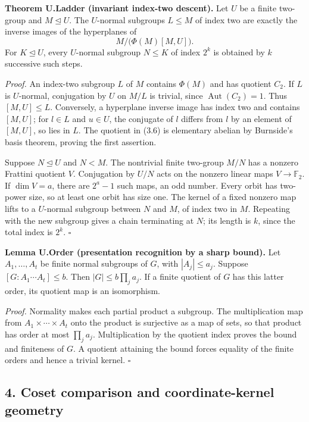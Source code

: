 \documentclass[
  11pt,
  a4paper,
]{article}
\begin{document}
\textbf{Theorem U.Ladder (invariant index-two descent).} Let \(U\) be a
finite two-group and \(M\unlhd U\). The \(U\)-normal subgroups
\(L\leq M\) of index two are exactly the inverse images of the
hyperplanes of \[
M/\bigl(\Phi(M)[M,U]\bigr).
\tag{3.6}
\] For \(K\unlhd U\), every \(U\)-normal subgroup \(N\leq K\) of index
\(2^k\) is obtained by \(k\) successive such steps.

\emph{Proof.} An index-two subgroup \(L\) of \(M\) contains \(\Phi(M)\)
and has quotient \(C_2\). If \(L\) is \(U\)-normal, conjugation by \(U\)
on \(M/L\) is trivial, since \(\operatorname{Aut}(C_2)=1\). Thus
\([M,U]\leq L\). Conversely, a hyperplane inverse image has index two
and contains \([M,U]\); for \(l\in L\) and \(u\in U\), the conjugate of
\(l\) differs from \(l\) by an element of \([M,U]\), so lies in \(L\).
The quotient in (3.6) is elementary abelian by Burnside's basis theorem,
proving the first assertion.

Suppose \(N\unlhd U\) and \(N<M\). The nontrivial finite two-group
\(M/N\) has a nonzero Frattini quotient \(V\). Conjugation by \(U/N\)
acts on the nonzero linear maps \(V\to\mathbb F_2\). If \(\dim V=a\),
there are \(2^a-1\) such maps, an odd number. Every orbit has two-power
size, so at least one orbit has size one. The kernel of a fixed nonzero
map lifts to a \(U\)-normal subgroup between \(N\) and \(M\), of index
two in \(M\). Repeating with the new subgroup gives a chain terminating
at \(N\); its length is \(k\), since the total index is \(2^k\).
\(\square\)

\textbf{Lemma U.Order (presentation recognition by a sharp bound).} Let
\(A_1,\ldots,A_t\) be finite normal subgroups of \(G\), with
\(|A_j|\leq a_j\). Suppose \([G:A_1\cdots A_t]\leq b\). Then
\(|G|\leq b\prod_j a_j\). If a finite quotient of \(G\) has this latter
order, its quotient map is an isomorphism.

\emph{Proof.} Normality makes each partial product a subgroup. The
multiplication map from \(A_1\times\cdots\times A_t\) onto the product
is surjective as a map of sets, so that product has order at most
\(\prod_j a_j\). Multiplication by the quotient index proves the bound
and finiteness of \(G\). A quotient attaining the bound forces equality
of the finite orders and hence a trivial kernel. \(\square\)

\subsection{4. Coset comparison and coordinate-kernel
geometry}\label{coset-comparison-and-coordinate-kernel-geometry}
\end{document}
